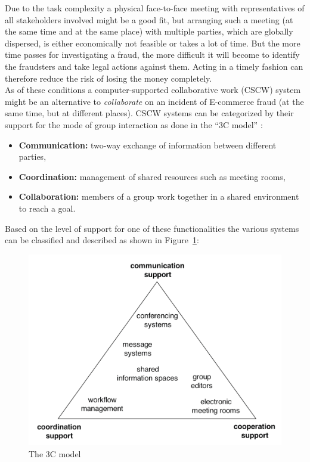 Due to the task complexity a physical face-to-face meeting with representatives of all stakeholders involved might be a good fit, but arranging such a meeting (at the same time and at the same place) with multiple parties, which are globally dispersed, is either economically not feasible or takes a lot of time. But the more time passes for investigating a fraud, the more difficult it will become to identify the fraudsters and take legal actions against them. Acting in a timely fashion can therefore reduce the risk of losing the money completely. \\

As of these conditions a computer-supported collaborative work (\gls{CSCW}) system might be an alternative to \emph{collaborate} on an incident of \gls{E-commerce} fraud (at the same time, but at different places). \gls{CSCW} systems can be categorized by their support for the mode of group interaction as done in the ``3C model'' \citep{Koch2008}: \@

\begin{itemize}
    \item\textbf{Communication:} two-way exchange of information between different parties,
    \item\textbf{Coordination:} management of shared resources such as meeting rooms,
    \item\textbf{Collaboration:} members of a group work together in a shared environment to reach a goal.
\end{itemize}

Based on the level of support for one of these functionalities the various systems can be classified and described as shown in Figure~\ref{fig:images_3C_model}: \@

\begin{figure}[H]
	\centering
		\includegraphics[width=0.9\columnwidth]{images/3C-model.png}
	\caption[The 3C model]{The 3C model \citep{Koch2008}}
\label{fig:images_3C_model}
\end{figure}

